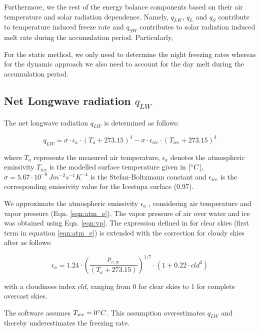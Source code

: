 \documentclass[utf8]{frontiersSCNS}
\begin{document}
Furthermore, we the rest of the energy balance components based on their air temperature and solar
radiation dependence. Namely, $q_{LW}$, $q_{L}$ and $q_{S}$ contribute to temperature induced freeze rate and
$q_{SW}$ contributes to solar radiation induced melt rate during the accumulation period.  Particularly,

For the static method, we only need to determine the night freezing rates whereas for the dynamic approach we
also need to account for the day melt during the accumulation period.

\subsection{Net Longwave radiation \texorpdfstring{$q_{LW}$}{Lg}} \label{sec:LW}
The net longwave radiation $q_{LW}$ is determined as follows:

\begin{equation}
	q_{LW}= \sigma \cdot \epsilon_a \cdot {(T_a+ 273.15)}^4 -\sigma \cdot \epsilon_{ice} \cdot {(T_{ice}+ 273.15)}^4
	\label{eqn:LW}
\end{equation}

where $T_a$ represents the measured air temperature, $\epsilon_a$ denotes the atmospheric emissivity $T_{ice}$
is the modelled surface temperature given in [$\degree C$], $\sigma=5.67\cdot10^{-8}\,Jm^{-2}s^{-1}K^{-4}$ is
the Stefan-Boltzmann constant and $\epsilon_{ice}$ is the corresponding emissivity value for the Icestupa
surface (0.97).

We approximate the atmospheric emissivity $\epsilon_a$ ,
considering air temperature and vapor pressure (Eqn. \ref{eqn:atm_e}). The vapor pressure of air over water and
ice was obtained using Eqn. \ref{eqn:vp}.  The expression defined in \cite{brutsaertDerivableFormulaLongwave1975} for clear skies
(first term in equation \ref{eqn:atm_e}) is extended with the correction for cloudy skies after
\cite{brutsaertEvaporationAtmosphereTheory1982} as follows:

\begin{equation}
	\epsilon_a=1.24 \cdot (\frac{p_{v,w}}{(T_a+273.15)})^{1/7}\cdot(1+0.22\cdot{cld}^2) \label{eqn:atm_e}
\end{equation}

with a cloudiness index $cld$, ranging from 0 for clear skies to 1 for complete overcast skies. 

The software assumes $T_{ice} = 0 \degree C$. This assumption overestimates $q_{LW}$ and thereby underestimates
the freezing rate.
\end{document}

